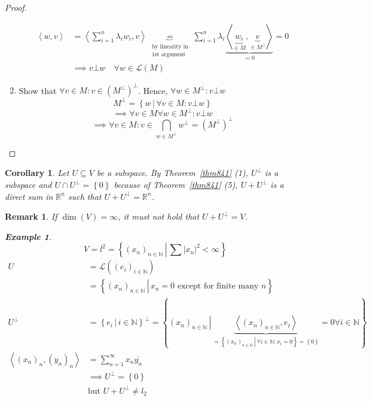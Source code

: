 \documentclass[a4paper]{article}
\newcounter{lecref}[section]
\numberwithin{lecref}{section}
\newtheorem*{Example}{Example}
\newtheorem{remark}[lecref]{Remark}
\newtheorem{corollary}[lecref]{Corollary}
\newcommand{\set}[1]{\left\{#1\right\}}
\newcommand{\setdef}[2]{\left\{\left.#1\,\right|\,#2\right\}}
\newcommand{\ip}[2]{\left\langle#1,#2\right\rangle} %
\newcommand{\card}[1]{\left|#1\right|}
\begin{document}
\begin{proof}
\begin{enumerate}
\begin{align*}
        \ip wv &= \ip{\sum_{i=1}^n \lambda_i w_i}{v} \underbrace{=}_{\substack{\text{by linearity in} \\ \text{1st argument}}} \sum_{i=1}^n \lambda_i \underbrace{\ip{\underbrace{w_i}_{\in M}}{\underbrace{v}_{\in M^\bot}}}_{= 0} = 0 \\
               & \implies v \bot w \quad \forall w \in \mathcal L(M)
      \end{align*}
    \item Show that $\forall v \in M: v \in (M^\bot)^\bot$. Hence, $\forall w \in M^\bot: v \bot w$
      \[ M^\bot = \setdef{w}{\forall v \in M: v \bot w} \]
      \[ \implies \forall v \in M \forall w \in M^\bot: v \bot w \]%
      \[ \implies \forall v \in M: v \in \bigcap_{w \in M^\bot} w^\bot = (M^\bot)^\bot \]
  \end{enumerate}
\end{proof}

\begin{corollary} %
  Let $U \subseteq V$ be a subspace.
  By Theorem~\ref{thm841} (1), $U^\bot$ is a subspace and $U \cap U^\bot = \set{0}$
  because of Theorem~\ref{thm841} (5), $U + U^\bot$ is a direct sum in $\mathbb R^n$ such that $U + U^\bot = \mathbb R^n$.
\end{corollary}

\begin{remark} %
  If $\dim(V) = \infty$, it must not hold that $U + U^\bot = V$.
  \begin{Example}
    \[ V = l^2 = \setdef{(x_n)_{n \in \mathbb N}}{\sum \card{x_n}^2 < \infty} \]
    \begin{align*}
      U &= \mathcal L((e_i)_{i \in \mathbb N}) \\
        &= \setdef{(x_n)_{n \in \mathbb N}}{x_n = 0 \text{ except for finite many } n} \\
      U^\bot &= \setdef{e_i}{i \in \mathbb N}^\bot = \setdef{(x_n)_{n \in \mathbb N}}{\underbrace{\ip{(x_n)_{n \in \mathbb N}}{e_i}}_{= \setdef{(x_n)_{n \in \mathbb N}}{\forall i \in \mathbb N: x_i = 0} = \set{0}} = 0 \forall i \in \mathbb N} \\
      \ip{(x_n)_{n}}{(y_n)_{n}} &= \sum_{n=1}^\infty x_n \overline{y_n} \\
        &\implies U^\bot = \set{0} \\
        &\text{but } U + U^\bot \neq l_2
    \end{align*}
  \end{Example}
\end{remark}
\end{document}
